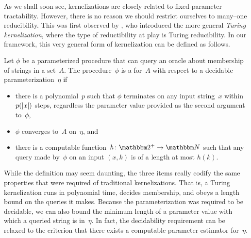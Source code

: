 As we shall soon see, kernelizations are closely related to fixed-parameter tractability.
However, there is no reason we should restrict ourselves to many--one reducibility.
This was first observed by \textcite{lokshtanov2009new}, who introduced the more general \emph{Turing kernelization}, where the type of reductibility at play is Turing reducibility.
In our framework, this very general form of kernelization can be defined as follows.
\begin{definition}
\label{def:turing_kernelization}%
  Let $\phi$ be a parameterized procedure that can query an oracle about membership of strings in a set~$A$.
  The procedure~$\phi$ is a  for~$A$ with respect to a decidable parameterization~$\eta$ if
  \begin{itemize}
  \item there is a polynomial~$p$ such that $\phi$ terminates on any input string~$x$ within $p({\lvert x\rvert})$ steps, regardless the parameter value provided as the second argument to~$\phi$,
  \item $\phi$ converges to~$A$ on~$\eta$, and
  \item there is a computable function~$h\colon \binary^+ \to \bbN$ such that any query made by~$\phi$ on an input $(x, k)$ is of a length at most $h(k)$.
  \end{itemize}
\end{definition}
While the definition may seem daunting, the three items really codify the same properties that were required of traditional kernelizations.
That is, a Turing kernelization runs in polynomial time, decides membership, and obeys a length bound on the queries it makes.
Because the parameterization was required to be decidable, we can also bound the minimum length of a parameter value with which a queried string is in~$\eta$.
In fact, the decidability requirement can be relaxed to the criterion that there exists a computable parameter estimator for~$\eta$.

